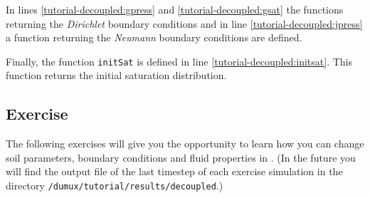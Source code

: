 In lines \ref{tutorial-decoupled:gpress} and \ref{tutorial-decoupled:gsat} the functions returning the \textit{Dirichlet} boundary conditions and in line \ref{tutorial-decoupled:jpress} a function returning the \textit{Neumann} boundary conditions are defined.

Finally, the function \texttt{initSat} is defined in line \ref{tutorial-decoupled:initsat}. This function returns the initial saturation distribution.

\subsection{Exercise}
\label{tutorial-deoucpled:exercises}
The following exercises will give you the opportunity to learn how you can change soil parameters, boundary conditions and fluid properties in \Dumux. (In the future you will find the output file of the last timestep of each exercise simulation in the directory \texttt{/dumux/tutorial/results/decoupled}.)

